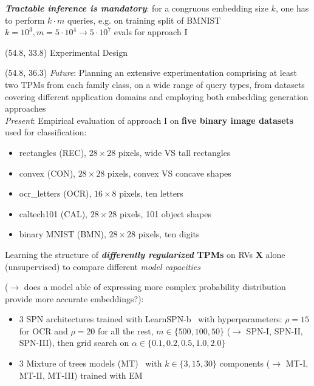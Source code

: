 \documentclass[final]{beamer}
\begin{document}
\begin{frame}{}
\begin{textblock}{25.2}
  \emph{\textbf{Tractable inference is mandatory}}:
  for a congruous embedding size $k$, one has to perform $k\cdot
    m$ queries, e.g. on training split of BMNIST $k=10^{3},m=5\cdot
    10^{4}\rightarrow 5\cdot 10^{7}$ evals for approach I
  
  \end{textblock}



  \begin{textblock}{20}(54.8, 33.8)
    Experimental Design
  \end{textblock}

  \begin{textblock}{25.2}(54.8, 36.3)
    \small
    \emph{Future}: Planning an extensive experimentation comprising at least two TPMs
    from each family class, on a wide range of query types, from
    datasets covering different application domains and employing both
    embedding generation approaches\\[20pt]
    
    \emph{Present}: Empirical evaluation of approach I on \textbf{five binary image datasets}
    used for classification:
    \begin{itemize}
    \item rectangles (\textsf{REC}), $28\times 28$ pixels, wide VS
      tall rectangles
    \item convex (\textsf{CON}), $28\times 28$ pixels, convex VS
      concave shapes
    \item ocr\_letters (\textsf{OCR}), $16\times 8$ pixels, ten letters
    \item caltech101 (\textsf{CAL}), $28\times 28$ pixels, 101 object shapes
    \item binary MNIST (\textsf{BMN}), $28\times 28$ pixels, ten
      digits
    \end{itemize}\vspace{15pt}
    
    Learning the structure of \textbf{\emph{differently regularized} TPMs} on RVs
    $\mathbf{X}$ alone (unsupervised) to compare different \emph{model
      capacities}\par
    ($\rightarrow$ does a model able of expressing more
    complex probability distribution provide more accurate embeddings?):
    \begin{itemize}
    \item 3 SPN architectures trained with
      \textsf{LearnSPN-b}~\parencite{Vergari2015} with
      hyperparameters: $\rho=15$ for \textsf{OCR}
      and $\rho=20$ for all the rest, $m\in\{500,
      100, 50\}$  ($\rightarrow$ \textsf{SPN-I}, \textsf{SPN-II},
      \textsf{SPN-III}), then grid search on $\alpha\in\{0.1, 0.2,
      0.5, 1.0, 2.0\}$
    \item 3 Mixture of trees models (MT)~\parencite{Meila2000} with $k\in\{3,15,30\}$
      components ($\rightarrow$ \textsf{MT-I}, \textsf{MT-II},
      \textsf{MT-III}) trained with EM
    \end{itemize}\vspace{15pt}
    

\end{textblock}
\end{frame}
\end{document}
